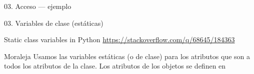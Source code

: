 \begin{frame}{03. Acceso — ejemplo}
  \scriptsize
\end{frame}

\begin{frame}{03. Variables de clase (estáticas)}
  \footnotesize
  \begin{block}{\centering Static class variables in Python}
    \centering \url{https://stackoverflow.com/q/68645/184363}
  \end{block}

  \vspace{0.5cm}
  {
    \normalsize
    \begin{alertblock}{\centering Moraleja}
      \centering Usamos las variables estáticas (o de clase) para los
      atributos que son  a todos los atributos de
      la clase. Los atributos de los objetos se definen en
    \end{alertblock}
  }
\end{frame}

